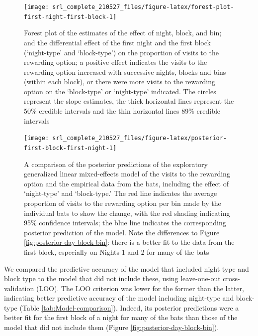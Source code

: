 \documentclass[
]{article}
\begin{document}
\begin{figure}[H]

{\centering \texttt{[image: srl\_complete\_210527\_files/figure-latex/forest-plot-first-night-first-block-1]} 

}

\caption{Forest plot of the estimates of the effect of night, block, and bin; and the differential effect of the first night and the first block (`night-type' and `block-type') on the proportion of visits to the rewarding option; a positive effect indicates the visits to the rewarding option increased with successive nights, blocks and bins (within each block), or there were more visits to the rewarding option on the `block-type' or `night-type' indicated. The circles represent the slope estimates, the thick horizontal lines represent the 50\% credible intervals and the thin horizontal lines 89\% credible intervals}\label{fig:forest-plot-first-night-first-block}
\end{figure}



\begin{figure}[H]

{\centering \texttt{[image: srl\_complete\_210527\_files/figure-latex/posterior-first-block-first-night-1]} 

}

\caption{A comparison of the posterior predictions of the exploratory generalized linear mixed-effects model of the visits to the rewarding option and the empirical data from the bats, including the effect of `night-type' and `block-type.' The red line indicates the average proportion of visits to the rewarding option per bin made by the individual bats to show the change, with the red shading indicating 95\% confidence intervals; the blue line indicates the corresponding posterior prediction of the model. Note the differences to Figure \ref{fig:posterior-day-block-bin}: there is a better fit to the data from the first block, especially on Nights 1 and 2 for many of the bats}\label{fig:posterior-first-block-first-night}
\end{figure}

We compared the predictive accuracy of the model that included night type and block type to the model that did not include these, using leave-one-out cross-validation (LOO). The LOO criterion was lower for the former than the latter, indicating better predictive accuracy of the model including night-type and block-type (Table \ref{tab:Model-comparison}). Indeed, its posterior predictions were a better fit for the first block of a night for many of the bats than those of the model that did not include them (Figure \ref{fig:posterior-day-block-bin}).
\end{document}
